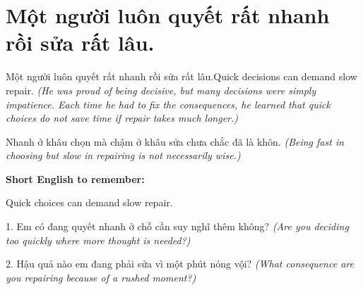\section{Một người luôn quyết rất nhanh rồi sửa rất lâu.}
\begin{truyen}{Một người luôn quyết rất nhanh rồi sửa rất lâu.}{Quick decisions can demand slow repair.}
\textit{(He was proud of being decisive, but many decisions were simply impatience. Each time he had to fix the consequences, he learned that quick choices do not save time if repair takes much longer.)}
\end{truyen}
\begin{baihoc}
Nhanh ở khâu chọn mà chậm ở khâu sửa chưa chắc đã là khôn.
\textit{(Being fast in choosing but slow in repairing is not necessarily wise.)}
\end{baihoc}
\begin{ghinhoanh}
\textbf{Short English to remember:}

Quick choices can demand slow repair.
\end{ghinhoanh}
\begin{tuhocnhanh}
1. Em có đang quyết nhanh ở chỗ cần suy nghĩ thêm không? \textit{(Are you deciding too quickly where more thought is needed?)}

2. Hậu quả nào em đang phải sửa vì một phút nóng vội? \textit{(What consequence are you repairing because of a rushed moment?)}
\end{tuhocnhanh}
\ngancach


